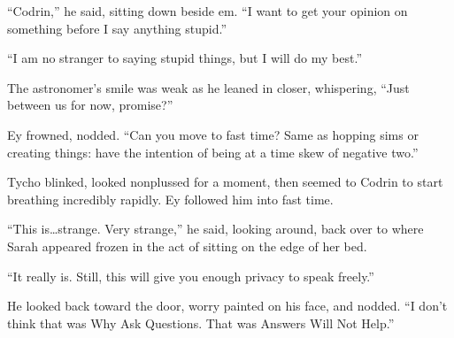 ``Codrin,'' he said, sitting down beside em. ``I want to get your opinion on something before I say anything stupid.''

``I am no stranger to saying stupid things, but I will do my best.''

The astronomer's smile was weak as he leaned in closer, whispering, ``Just between us for now, promise?''

Ey frowned, nodded. ``Can you move to fast time? Same as hopping sims or creating things: have the intention of being at a time skew of negative two.''

Tycho blinked, looked nonplussed for a moment, then seemed to Codrin to start breathing incredibly rapidly. Ey followed him into fast time.

``This is\ldots strange. Very strange,'' he said, looking around, back over to where Sarah appeared frozen in the act of sitting on the edge of her bed.

``It really is. Still, this will give you enough privacy to speak freely.''

He looked back toward the door, worry painted on his face, and nodded. ``I don't think that was Why Ask Questions. That was Answers Will Not Help.''
